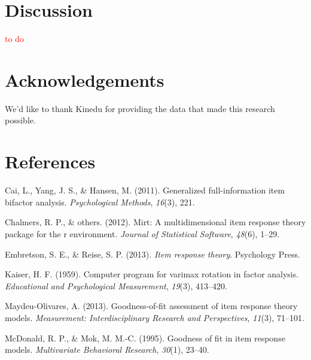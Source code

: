 \documentclass[10pt, letterpaper]{article}
\begin{document}
\hypertarget{discussion}{%
\section{Discussion}\label{discussion}}

\textcolor{red}{to do}

\hypertarget{acknowledgements}{%
\section{Acknowledgements}\label{acknowledgements}}

We'd like to thank Kinedu for providing the data that made this research
possible.

\hypertarget{references}{%
\section{References}\label{references}}

\setlength{\parindent}{-0.1in} 
\setlength{\leftskip}{0.125in}

\noindent

\hypertarget{refs}{}
\leavevmode\hypertarget{ref-cai2011generalized}{}%
Cai, L., Yang, J. S., \& Hansen, M. (2011). Generalized full-information
item bifactor analysis. \emph{Psychological Methods}, \emph{16}(3), 221.

\leavevmode\hypertarget{ref-chalmers2012mirt}{}%
Chalmers, R. P., \& others. (2012). Mirt: A multidimensional item
response theory package for the r environment. \emph{Journal of
Statistical Software}, \emph{48}(6), 1--29.

\leavevmode\hypertarget{ref-embretson2013item}{}%
Embretson, S. E., \& Reise, S. P. (2013). \emph{Item response theory}.
Psychology Press.

\leavevmode\hypertarget{ref-kaiser1959computer}{}%
Kaiser, H. F. (1959). Computer program for varimax rotation in factor
analysis. \emph{Educational and Psychological Measurement},
\emph{19}(3), 413--420.

\leavevmode\hypertarget{ref-maydeu2013goodness}{}%
Maydeu-Olivares, A. (2013). Goodness-of-fit assessment of item response
theory models. \emph{Measurement: Interdisciplinary Research and
Perspectives}, \emph{11}(3), 71--101.

\leavevmode\hypertarget{ref-mcdonald1995goodness}{}%
McDonald, R. P., \& Mok, M. M.-C. (1995). Goodness of fit in item
response models. \emph{Multivariate Behavioral Research}, \emph{30}(1),
23--40.
\end{document}
